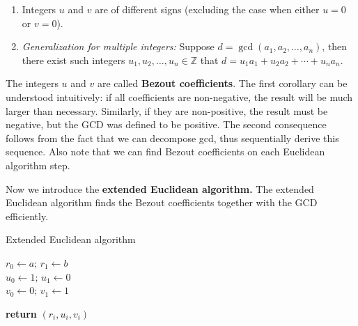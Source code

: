 \documentclass[../lecture-notes.tex]{subfiles}
\begin{document}
\begin{corollary} 
    \hfill
    \begin{enumerate}
        \item Integers $u$ and $v$ are of different signs (excluding the case when either $u=0$ or $v=0$).
        \item \textit{Generalization for multiple integers:} Suppose $d = \gcd(a_1, a_2, \dots, a_n)$, then there exist such integers $u_1, u_2, \dots, u_n \in \mathbb{Z}$ that $d = u_1 a_1 + u_2 a_2 + \cdots + u_n a_n$.
    \end{enumerate}    
\end{corollary}

The integers $u$ and $v$ are called \textbf{Bezout coefficients}. The first
corollary can be understood intuitively: if all coefficients are non-negative,
the result will be much larger than necessary. Similarly, if they are
non-positive, the result must be negative, but the GCD was defined to be
positive. The second consequence follows from the fact that we can decompose
gcd, thus sequentially derive this sequence. Also note that we can find Bezout
coefficients on each Euclidean algorithm step.

Now we introduce the \textbf{extended Euclidean algorithm.} The extended
Euclidean algorithm finds the Bezout coefficients together with the GCD
efficiently.

\begin{algorithm}[H]
    \caption{Extended Euclidean algorithm} \label{alg:extended_euclidean}
        
    $r_{0} \gets a; \, r_{1} \gets b$ \\
    $u_{0} \gets 1; \, u_{1} \gets 0$ \\
    $v_{0} \gets 0; \, v_{1} \gets 1$ \\


    \textbf{return} $(r_i, u_i, v_i)$
\end{algorithm}
\end{document}
